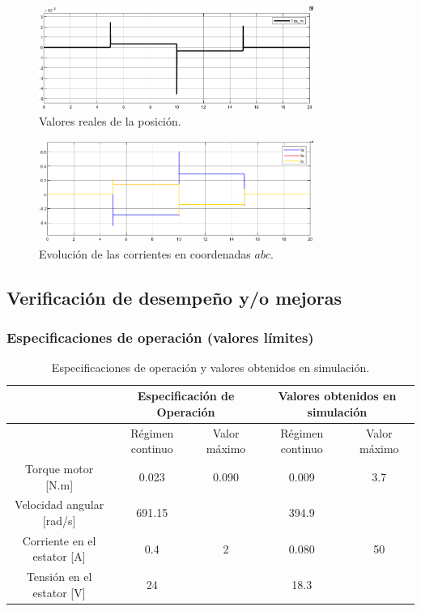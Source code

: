 \documentclass{article}
\begin{document}
\begin{figure}[H]
    \centering
    \includegraphics[width=0.8\textwidth]{5.2.4.b.3.png}
    \caption{Valores reales de la posición.}
\end{figure}

\begin{figure}[H]
    \centering
    \includegraphics[width=0.8\textwidth]{5.2.4.b.5.png}
    \caption{Evolución de las corrientes en coordenadas $abc$.}
\end{figure}


\subsection{Verificación de desempeño y/o mejoras}


\subsubsection{Especificaciones de operación (valores límites)}

\begin{table}[H]
    \begin{center}
    \begin{tabular}{|c|c|c|c|c|}
        \hline
         & \multicolumn{2}{c|}{Especificación de Operación} & \multicolumn{2}{c|}{Valores obtenidos en simulación} \\
        \hline
         & Régimen continuo & Valor máximo & Régimen continuo & Valor máximo \\
        \hline
        Torque motor [N.m] & 0.023 & 0.090 & 0.009 & 3.7 \\
        \hline
        Velocidad angular [rad/s] & 691.15 &  & 394.9 &  \\
        \hline
        Corriente en el estator [A] & 0.4 & 2 & 0.080 & 50 \\
        \hline
        Tensión en el estator [V] & 24 &  & 18.3 &\\
        \hline
    \end{tabular}
\end{center}
\caption{Especificaciones de operación y valores obtenidos en simulación.}
\end{table}
\end{document}
